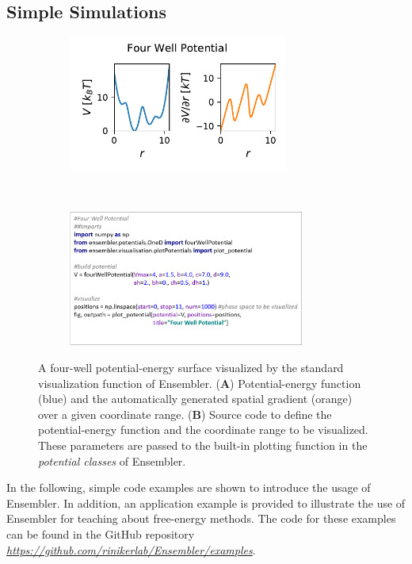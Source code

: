 \subsection{Simple Simulations}
\begin{figure}[h!]
	\centering
	\begin{subfigure}{0.85\textwidth}
		\includegraphics[width=\linewidth, height=1.75in]{fig/codeExamples/four_well.pdf} 
		\caption{}
	\end{subfigure}\\
	\begin{subfigure}{0.85\textwidth}
		\includegraphics[width=\linewidth, height=1.75in]{fig/codeExamples/Potential_code.png}
		\caption{}
	\end{subfigure}
	\caption{A four-well potential-energy surface visualized by the standard visualization function of Ensembler. (\textbf{A}) Potential-energy function (blue) and the automatically generated spatial gradient (orange) over a given coordinate range. (\textbf{B}) Source code to define the potential-energy function and the coordinate range to be visualized. These parameters are passed to the built-in plotting function in the \textit{potential classes} of Ensembler.}
	\label{fig:code_example_potential}
\end{figure}

In the following, simple code examples are shown to introduce the usage of Ensembler. In addition, an application example is provided to illustrate the use of Ensembler for teaching about free-energy methods. 
The code for these examples can be found in the GitHub repository \textit{\hyperlink{https://github.com/rinikerlab/Ensembler}{https://github.com/rinikerlab/Ensembler/examples}}.

